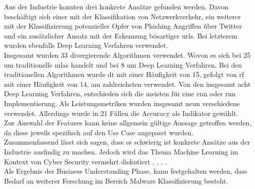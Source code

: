 \documentclass[
    12pt, %
    DIV10,
    ngerman, %
    a4paper, %
    oneside, %
    titlepage, %
    parskip=half, %
    headings=normal, %
    listof=totoc, %
    bibliography=totoc, %
    index=totoc, %
    captions=tableheading, %
    final %
]{scrreprt}
\begin{document}
Aus der Industrie konnten drei konkrete Ansätze gefunden werden. Davon beschäftigt sich einer mit der Klassifikation von Netzwerkverkehr, ein weiterer mit der Klassifizierung potenzieller Opfer von Phishing Angriffen über Twitter und ein  zusätzlicher Ansatz mit der Erkennung bösartiger \ac{urls}. Bei letzterem wurden ebenfalls Deep Learning Verfahren verwendet.\\
Insgesamt wurden 33 divergierende Algorithmen verwendet. Wovon es sich bei 25 um traditionelle \ac{mlas} handelt und bei 8 um Deep Learning Verfahren. Bei den traditionellen Algorithmen wurde \ac{dt} mit einer Häufigkeit von 15, gefolgt von \ac{rf} mit einer Häufigkeit von 14, am zahlreichsten verwendet. Von den insgesamt acht Deep Learning Verfahren, entschieden sich die meisten für eine \ac{cnn} oder \ac{rnn} Implementierung. Als Leistungsmetriken wurden insgesamt neun verschiedene verwendet. Allerdings wurde in 21 Fällen die Accuracy als Indikator gewählt.\\
Zur Auswahl der Features kann keine allgemein gültige Aussage getroffen werden, da diese jeweils spezifisch auf den Use Case angepasst wurden.\\
Zusammenfassend lässt sich sagen, dass es schwierig ist konkrete Ansätze aus der Industrie ausfindig zu machen. Jedoch wird das Thema Machine Learning im Kontext von Cyber Security vermehrt diskutiert \parencite{Pinto2014}, \parencite{Learning}, \parencite{Grieco2016}, \parencite{Clarencechio}.\\
Als Ergebnis der Business Understanding Phase, kann festgehalten werden, dass Bedarf an weiterer Forschung im Bereich Malware Klassifizierung besteht.
\end{document}
